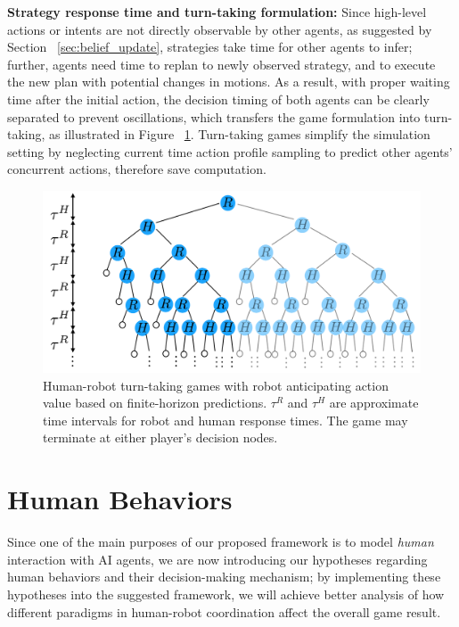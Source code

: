 \documentclass[letterpaper, 10 pt, conference]{ieeeconf}  %
\begin{document}
\textbf{Strategy response time and turn-taking formulation:}
Since high-level actions or intents are not directly observable by other 
agents, as suggested by Section ~\ref{sec:belief_update}, strategies take time 
for other agents to infer; further, agents need time to replan to newly 
observed strategy, and to execute the new plan with potential changes in 
motions. As a result, with proper waiting time after the initial action, the 
decision timing of both agents can be clearly separated to prevent 
oscillations, which transfers the game formulation into turn-taking, as 
illustrated in Figure ~\ref{fig:turn_taking}. 
Turn-taking games simplify the 
simulation setting by neglecting current time action profile sampling to 
predict other agents' concurrent actions, therefore save computation. 
\begin{figure}[t]
      \centering
      \vspace{-1em}
      \includegraphics[scale=0.2]{turn_taking}
      \vspace{-1.4em}
      \caption{
        Human-robot turn-taking games with robot anticipating action value based on finite-horizon predictions. $\tau^R$ and $\tau^H$ are approximate time intervals for robot and human response times. The game may terminate at either player's decision nodes.}
      \vspace{-1.7em}
     \label{fig:turn_taking}
\end{figure}
\section{Human Behaviors}\label{sec:human_behavior}
Since one of the main purposes of our proposed framework is to model 
\textit{human} interaction with AI agents, we are now introducing our 
hypotheses regarding human behaviors and their decision-making mechanism; by 
implementing these hypotheses into the suggested framework, we will achieve 
better analysis of how different paradigms in human-robot coordination affect 
the overall game result.
\vspace{-.2em}
\end{document}
